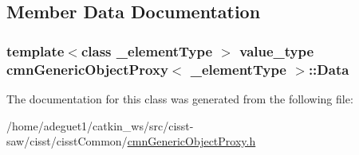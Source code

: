 \subsection{Member Data Documentation}
\hypertarget{classcmn_generic_object_proxy_a1c215839c40dbb71a7e2609b71a80f71}{
\subsubsection[{Data}]{\setlength{\rightskip}{0pt plus 5cm}template$<$class \-\_\-element\-Type $>$ {\bf value\-\_\-type} {\bf cmn\-Generic\-Object\-Proxy}$<$ \-\_\-element\-Type $>$\-::Data}}\label{classcmn_generic_object_proxy_a1c215839c40dbb71a7e2609b71a80f71}


The documentation for this class was generated from the following file\-:\begin{DoxyCompactItemize}
\item 
/home/adeguet1/catkin\-\_\-ws/src/cisst-\/saw/cisst/cisst\-Common/\hyperlink{cmn_generic_object_proxy_8h}{cmn\-Generic\-Object\-Proxy.\-h}\end{DoxyCompactItemize}
